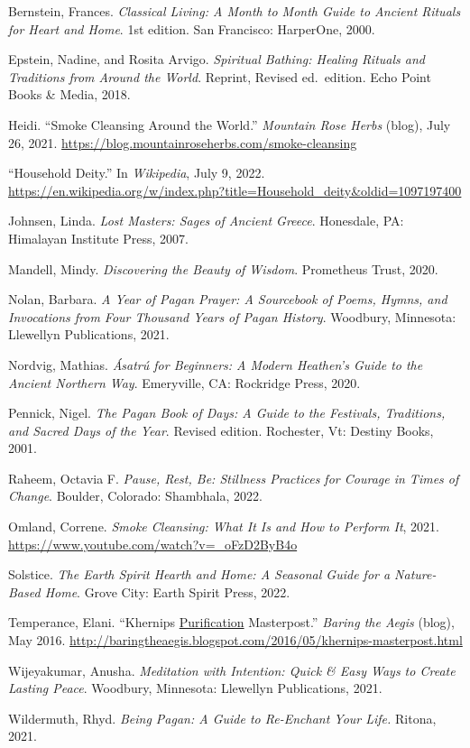 \documentclass[
]{book}
\begin{document}
Bernstein, Frances. \emph{Classical Living: A Month to Month Guide to Ancient Rituals for Heart and Home}. 1st edition. San Francisco: HarperOne, 2000.

Epstein, Nadine, and Rosita Arvigo. \emph{Spiritual Bathing: Healing Rituals and Traditions from Around the World}. Reprint, Revised ed.~edition. Echo Point Books \& Media, 2018.

Heidi. ``Smoke Cleansing Around the World.'' \emph{Mountain Rose Herbs} (blog), July 26, 2021. \url{https://blog.mountainroseherbs.com/smoke-cleansing}

``Household Deity.'' In \emph{Wikipedia}, July 9, 2022. \url{https://en.wikipedia.org/w/index.php?title=Household_deity\&oldid=1097197400}

Johnsen, Linda. \emph{Lost Masters: Sages of Ancient Greece}. Honesdale, PA: Himalayan Institute Press, 2007.

Mandell, Mindy. \emph{Discovering the Beauty of Wisdom}. Prometheus Trust, 2020.

Nolan, Barbara. \emph{A Year of Pagan Prayer: A Sourcebook of Poems, Hymns, and Invocations from Four Thousand Years of Pagan History}. Woodbury, Minnesota: Llewellyn Publications, 2021.

Nordvig, Mathias. \emph{Ásatrú for Beginners: A Modern Heathen's Guide to the Ancient Northern Way}. Emeryville, CA: Rockridge Press, 2020.

Pennick, Nigel. \emph{The Pagan Book of Days: A Guide to the Festivals, Traditions, and Sacred Days of the Year}. Revised edition. Rochester, Vt: Destiny Books, 2001.

Raheem, Octavia F. \emph{Pause, Rest, Be: Stillness Practices for Courage in Times of Change}. Boulder, Colorado: Shambhala, 2022.

Omland, Correne. \emph{Smoke Cleansing: What It Is and How to Perform It}, 2021. \url{https://www.youtube.com/watch?v=_oFzD2ByB4o}

Solstice. \emph{The Earth Spirit Hearth and Home: A Seasonal Guide for a Nature-Based Home}. Grove City: Earth Spirit Press, 2022.

Temperance, Elani. ``Khernips \protect\hyperlink{purification}{Purification} Masterpost.'' \emph{Baring the Aegis} (blog), May 2016. \url{http://baringtheaegis.blogspot.com/2016/05/khernips-masterpost.html}

Wijeyakumar, Anusha. \emph{Meditation with Intention: Quick \& Easy Ways to Create Lasting Peace}. Woodbury, Minnesota: Llewellyn Publications, 2021.

Wildermuth, Rhyd. \emph{Being Pagan: A Guide to Re-Enchant Your Life.} Ritona, 2021.
\end{document}
